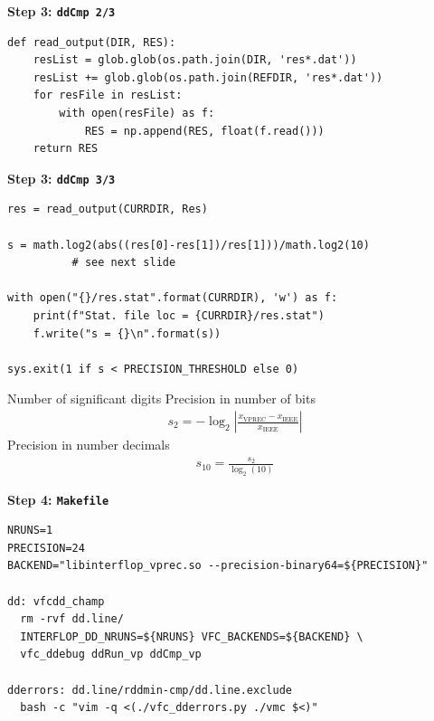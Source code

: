 \documentclass[aspectratio=169]{beamer}
\begin{document}
    \begin{frame}[fragile]{\textbf{Step 3: \texttt{ddCmp 2/3}}}
      \begin{verbatim}
def read_output(DIR, RES):
    resList = glob.glob(os.path.join(DIR, 'res*.dat'))
    resList += glob.glob(os.path.join(REFDIR, 'res*.dat'))
    for resFile in resList:
        with open(resFile) as f:
            RES = np.append(RES, float(f.read()))
    return RES
      \end{verbatim}
    \end{frame}


    \begin{frame}[fragile]{\textbf{Step 3: \texttt{ddCmp 3/3}}}
      \begin{verbatim}
res = read_output(CURRDIR, Res)

s = math.log2(abs((res[0]-res[1])/res[1]))/math.log2(10)
          # see next slide

with open("{}/res.stat".format(CURRDIR), 'w') as f:
    print(f"Stat. file loc = {CURRDIR}/res.stat")
    f.write("s = {}\n".format(s))

sys.exit(1 if s < PRECISION_THRESHOLD else 0)
      \end{verbatim}
    \end{frame}

    \begin{frame}{Number of significant digits}
      Precision in number of bits
      \begin{align*}
	     s_2 = -\log_2\left|\frac{x_\mathrm{VPREC} - x_\mathrm{IEEE}}{x_\mathrm{IEEE}}\right|
      \end{align*}
      Precision in number decimals
      \begin{align*}
	     s_{10} = \frac{s_2}{\log_2(10)}
      \end{align*}
      
    \end{frame}

    \begin{frame}[fragile]{\textbf{Step 4: \texttt{Makefile}}}
      \begin{verbatim}
NRUNS=1
PRECISION=24
BACKEND="libinterflop_vprec.so --precision-binary64=${PRECISION}"

dd: vfcdd_champ
  rm -rvf dd.line/
  INTERFLOP_DD_NRUNS=${NRUNS} VFC_BACKENDS=${BACKEND} \
  vfc_ddebug ddRun_vp ddCmp_vp

dderrors: dd.line/rddmin-cmp/dd.line.exclude
  bash -c "vim -q <(./vfc_dderrors.py ./vmc $<)"
      \end{verbatim}
    \end{frame}
    
\end{document}
